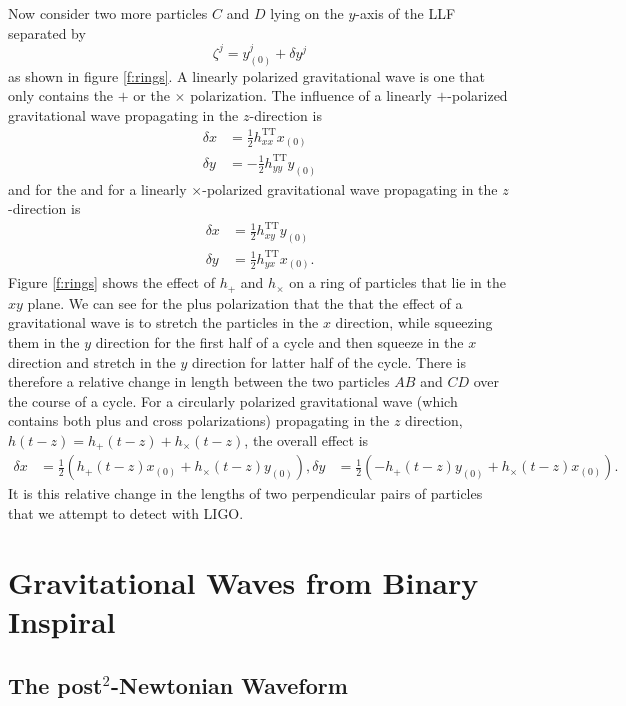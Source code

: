 Now consider two more particles $C$ and $D$ lying on the $y$-axis of the LLF
separated by 
\begin{equation}
\zeta^j = y^j_{(0)} + \delta y^j
\end{equation}
as shown in figure \ref{f:rings}. A linearly polarized gravitational wave is
one that only contains the $+$ or the $\times$ polarization. The influence of
a linearly $+$-polarized gravitational wave propagating in the $z$-direction
is
\begin{align}
\delta x &= \frac{1}{2} h_{xx}^\mathrm{TT} x_{(0)}\\
\delta y &= -\frac{1}{2} h_{yy}^\mathrm{TT} y_{(0)}
\end{align}
and for the and for a linearly $\times$-polarized gravitational wave
propagating in the $z$-direction is
\begin{align}
\delta x &= \frac{1}{2} h_{xy}^\mathrm{TT} y_{(0)}\\
\delta y &= \frac{1}{2} h_{yx}^\mathrm{TT} x_{(0)}.
\end{align}
Figure \ref{f:rings} shows the effect of $h_{+}$ and $h_{\times}$ on a ring
of particles that lie in the $xy$ plane. We can see for the plus polarization
that the that the effect of a gravitational wave is to stretch the particles
in the $x$ direction, while squeezing them in the $y$ direction for the first
half of a cycle and then squeeze in the $x$ direction and stretch in the $y$
direction for latter half of the cycle.  There is therefore a relative change
in length between the two particles $AB$ and $CD$ over the course of a cycle.
For a circularly polarized gravitational wave (which contains both plus and
cross polarizations) propagating in the $z$ direction, $h(t-z) =
h_{+}(t-z) + h_{\times}(t-z)$, the overall effect is
\begin{align}
\delta x &= \frac{1}{2}\left(h_{+}(t-z) x_{(0)} + h_{\times}(t-z) y_{(0)}\right),
\delta y &= \frac{1}{2}\left(-h_{+}(t-z) y_{(0)} + h_{\times}(t-z) x_{(0)}\right).
\end{align}
It is this relative change in the lengths of two perpendicular pairs of
particles that we attempt to detect with LIGO. 

\section{Gravitational Waves from Binary Inspiral}

\subsection{The post$^2$-Newtonian Waveform}


